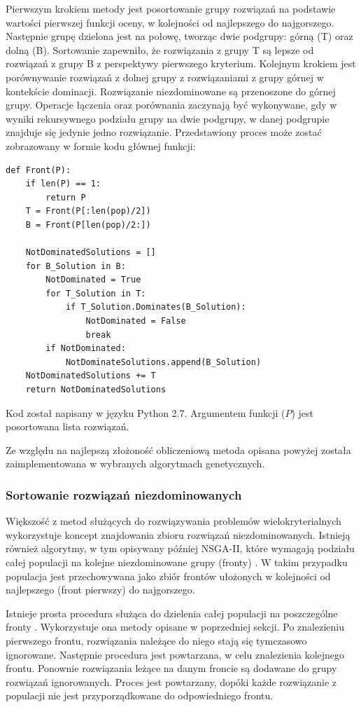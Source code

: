 \documentclass[twoside]{iisthesis}
\begin{document}
Pierwszym krokiem metody jest posortowanie grupy rozwiązań na podstawie wartości pierwszej funkcji oceny, w kolejności od najlepszego do najgorszego. Następnie grupę dzielona jest na połowę, tworząc dwie podgrupy: górną (T) oraz dolną (B). Sortowanie zapewniło, że rozwiązania z grupy T są lepsze od rozwiązań z grupy B z perspektywy pierwszego kryterium. Kolejnym krokiem jest porównywanie rozwiązań z dolnej grupy z rozwiązaniami z grupy górnej w kontekście dominacji. Rozwiązanie niezdominowane są przenoszone do górnej grupy. Operacje łączenia oraz porównania zaczynają być wykonywane, gdy w wyniki rekursywnego podziału grupy na dwie podgrupy, w danej podgrupie znajduje się jedynie jedno rozwiązanie. Przedstawiony proces może zostać zobrazowany w formie kodu głównej funkcji:
\begin{lstlisting}[label=some-code,caption=Znajdowanie rozwiązań niezdominowanych]
def Front(P):
	if len(P) == 1:
		return P
	T = Front(P[:len(pop)/2])
	B = Front(P[len(pop)/2:])
	
	NotDominatedSolutions = []
	for B_Solution in B:
		NotDominated = True
		for T_Solution in T:
			if T_Solution.Dominates(B_Solution):
				NotDominated = False
				break
		if NotDominated:
			NotDominateSolutions.append(B_Solution)
	NotDominatedSolutions += T
	return NotDominatedSolutions
\end{lstlisting}
Kod został napisany w języku Python 2.7. Argumentem funkcji ($P$) jest posortowana lista rozwiązań.

Ze względu na najlepszą złożoność obliczeniową metoda opisana powyżej została zaimplementowana w wybranych algorytmach genetycznych.

\subsubsection{Sortowanie rozwiązań niezdominowanych}
Większość z metod służących do rozwiązywania problemów wielokryterialnych wykorzystuje koncept znajdowania zbioru rozwiązań niezdominowanych. Istnieją również algorytmy, w tym opisywany później NSGA-II, które wymagają podziału całej populacji na kolejne niezdominowane grupy (fronty) \cite{book}. W takim przypadku populacja jest przechowywana jako zbiór frontów ułożonych w kolejności od najlepszego (front pierwszy) do najgorszego.

Istnieje prosta procedura służąca do dzielenia całej populacji na poszczególne fronty \cite{nsga}. Wykorzystuje ona metody opisane w poprzedniej sekcji. Po znalezieniu pierwszego frontu, rozwiązania należące do niego stają się tymczasowo ignorowane. Następnie procedura jest powtarzana, w celu znalezienia kolejnego frontu. Ponownie rozwiązania leżące na danym froncie są dodawane do grupy rozwiązań ignorowanych. Proces jest powtarzany, dopóki każde rozwiązanie z populacji nie jest przyporządkowane do odpowiedniego frontu.
\end{document}
